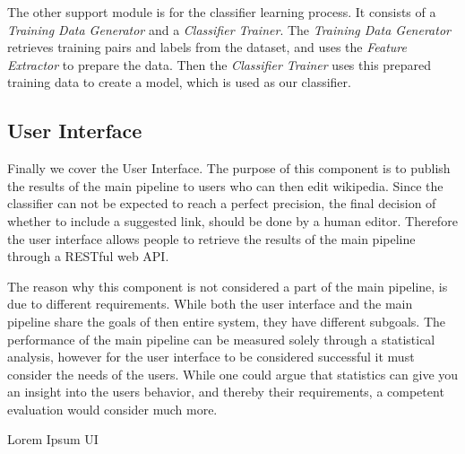 The other support module is for the classifier learning process. It consists of a \emph{Training Data Generator} and a \emph{Classifier Trainer}. The \emph{Training Data Generator} retrieves training pairs and labels from the dataset, and uses the \emph{Feature Extractor} to prepare the data. Then the \emph{Classifier Trainer} uses this prepared training data to create a model, which is used as our classifier.

\subsection{User Interface}

Finally we cover the User Interface. The purpose of this component is to publish the results of the main pipeline to users who can then edit wikipedia. Since the classifier can not be expected to reach a perfect precision, the final decision of whether to include a suggested link, should be done by a human editor. Therefore the user interface allows people to retrieve the results of the main pipeline through a RESTful web API.

The reason why this component is not considered a part of the main pipeline, is due to different requirements. While both the user interface and the main pipeline share the goals of then entire system, they have different subgoals. The performance of the main pipeline can be measured solely through a statistical analysis, however for the user interface to be considered successful it must consider the needs of the users. While one could argue that statistics can give you an insight into the users behavior, and thereby their requirements, a competent evaluation would consider much more.


Lorem Ipsum UI










